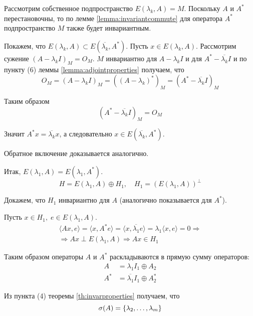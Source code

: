 \begin{proofbreak}
    \dindent Рассмотрим собственное подпространство $E(\lambda_k, A) = M$. Поскольку $A$ и
    $A^*$ перестановочны, то по лемме \ref{lemma:invariantcommute} для оператора
    $A^*$ подпространство $M$ также будет инвариантным.

    Покажем, что $E(\lambda_k, A) \subset E(\overline{\lambda_k},A^*)$.
    Пусть $x \in E(\lambda_k, A)$.
    Рассмотрим сужение $(A-\lambda_k I)_M = O_M$. $M$ инвариантно для
    $A-\lambda_k I$ и для $A^* - \overline{\lambda_k} I$ и по пункту (6) леммы
    \ref{lemma:adjointproperties} получаем, что
    \[ O_M = (A-\lambda_k I)_M = ((A-\lambda_k)^*)_M = (A^* - \overline{\lambda_k}
    I)_M \]

    Таким образом
    \[ (A^* - \overline{\lambda_k} I)_M = O_M \]

    Значит $A^*x = \overline{\lambda_k} x$, а следовательно $x \in
    E(\overline{\lambda_k}, A^*)$.

    Обратное включение доказывается аналогично.

    Итак, $E(\lambda_1, A) = E(\lambda_1, A^*)$.
    \[ H = E(\lambda_1, A) \oplus H_1, \quad H_1 = (E(\lambda_1,A))^\perp \]

    Докажем, что $H_1$ инвариантно для $A$ (аналогично показывается для $A^*$).

    Пусть $x \in H_1,\; e\in E(\lambda_1, A)$.
    \begin{multline*}
        \langle Ax, e\rangle = \langle x, A^* e\rangle = \langle x,
        \overline{\lambda_1} e\rangle = \lambda_1 \langle x, e\rangle = 0
        \Rightarrow \\ \Rightarrow Ax \perp E(\lambda_1, A) \Rightarrow Ax \in H_1
    \end{multline*}

    Таким образом операторы $A$ и $A^*$ раскладываются в прямую сумму
    операторов:
    \[
        \begin{aligned}
            A &= \lambda_1 I_1 \oplus A_2 \\
            A^* &= \overline{\lambda_1} I_1 \oplus A_2^*
        \end{aligned}
    \]

    Из пункта (4) теоремы \ref{th:invarproperties} получаем, что
    \[ \operatorname{\sigma}(A) = \left\{\lambda_2, \dotsc, \lambda_m\right\} \]


\end{proofbreak}
